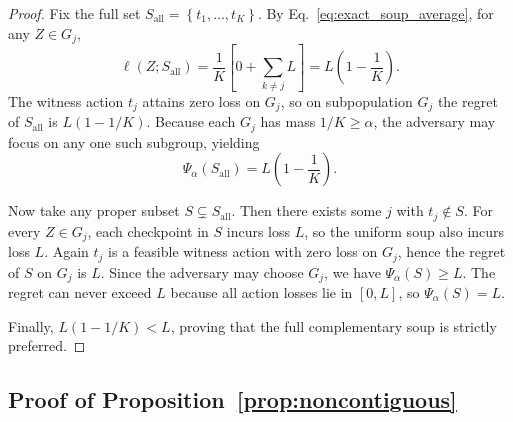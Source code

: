 \documentclass{article}
\newcommand{\braces}[1]{\left\{ #1 \right\}}
\newcommand{\paren}[1]{\left( #1 \right)}
\newcommand{\loss}{\ell}
\newcommand{\1}{\mathbbm{1}}
\begin{document}
\begin{proof}
Fix the full set \(S_{\mathrm{all}}=\braces{t_1,\ldots,t_K}\). By Eq.~\eqref{eq:exact_soup_average}, for any \(Z\in G_j\),
\[
    \loss(Z;S_{\mathrm{all}})
    =
    \frac{1}{K}
    \left[
        0 + \sum_{k\neq j} L
    \right]
    =
    L\paren{1-\frac{1}{K}}.
\]
The witness action \(t_j\) attains zero loss on \(G_j\), so on subpopulation \(G_j\) the regret of \(S_{\mathrm{all}}\) is \(L(1-1/K)\). Because each \(G_j\) has mass \(1/K\ge \alpha\), the adversary may focus on any one such subgroup, yielding
\[
    \Psi_\alpha(S_{\mathrm{all}})
    =
    L\paren{1-\frac{1}{K}}.
\]

Now take any proper subset \(S\subsetneq S_{\mathrm{all}}\). Then there exists some \(j\) with \(t_j\notin S\). For every \(Z\in G_j\), each checkpoint in \(S\) incurs loss \(L\), so the uniform soup also incurs loss \(L\). Again \(t_j\) is a feasible witness action with zero loss on \(G_j\), hence the regret of \(S\) on \(G_j\) is \(L\). Since the adversary may choose \(G_j\), we have \(\Psi_\alpha(S)\ge L\). The regret can never exceed \(L\) because all action losses lie in \([0,L]\), so \(\Psi_\alpha(S)=L\).

Finally, \(L(1-1/K)<L\), proving that the full complementary soup is strictly preferred.
\end{proof}

\subsection{Proof of Proposition~\ref{prop:noncontiguous}}
\end{document}
